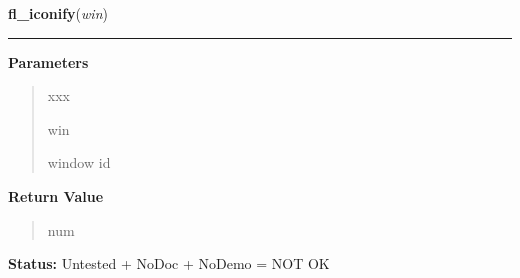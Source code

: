     \label{xformslib:library:fl_iconify}

    \vspace{0.5ex}

\hspace{.8\funcindent}\begin{boxedminipage}{\funcwidth}

    \raggedright \textbf{fl\_iconify}(\textit{win})

    \vspace{-1.5ex}

    \rule{\textwidth}{0.5\fboxrule}
\setlength{\parskip}{2ex}
\setlength{\parskip}{1ex}
      \textbf{Parameters}
      \vspace{-1ex}

      \begin{quote}
        \begin{Ventry}{xxx}

          \item[win]

          window id

        \end{Ventry}

      \end{quote}

      \textbf{Return Value}
    \vspace{-1ex}

      \begin{quote}
      num

      \end{quote}

\textbf{Status:} Untested + NoDoc + NoDemo = NOT OK



    \end{boxedminipage}

    \label{xformslib:library:fl_winresize}

    \vspace{0.5ex}

